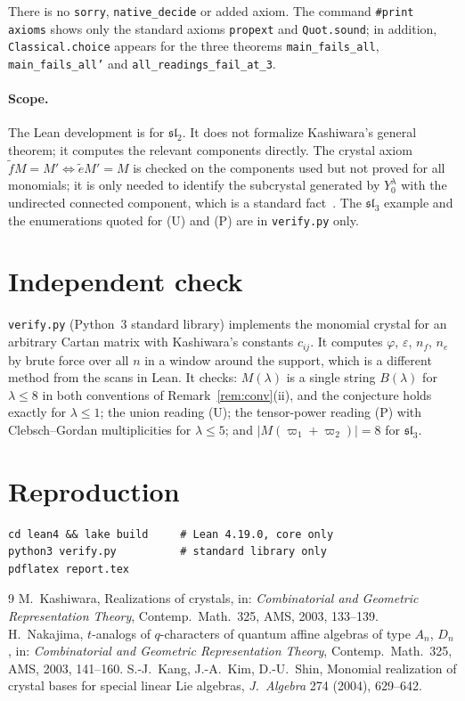 \documentclass[11pt]{article}
\theoremstyle{definition}
\theoremstyle{remark}
\newcommand{\et}{\tilde e}
\newcommand{\ft}{\tilde f}
\begin{document}
There is no \texttt{sorry}, \texttt{native\_decide} or added axiom.
The command \texttt{\#print axioms} shows only the standard axioms
\texttt{propext} and \texttt{Quot.sound}; in addition,
\texttt{Classical.choice} appears for the three theorems
\texttt{main\_fails\_all}, \texttt{main\_fails\_all'} and
\texttt{all\_readings\_fail\_at\_3}.

\paragraph{Scope.} The Lean development is for $\mathfrak{sl}_2$. It does not
formalize Kashiwara's general theorem; it computes the relevant components
directly. The crystal axiom $\ft M=M'\iff\et M'=M$ is checked on the components
used but not proved for all monomials; it is only needed to identify the
subcrystal generated by $Y_0^\lambda$ with the undirected connected component,
which is a standard fact~\cite{kas}. The $\mathfrak{sl}_3$ example and the
enumerations quoted for (U) and (P) are in \texttt{verify.py} only.

\section{Independent check}
\texttt{verify.py} (Python~3 standard library) implements the monomial crystal
for an arbitrary Cartan matrix with Kashiwara's constants $c_{ij}$. It computes
$\varphi$, $\varepsilon$, $n_f$, $n_e$ by brute force over all $n$ in a window
around the support, which is a different method from the scans in Lean. It
checks: $M(\lambda)$ is a single string $B(\lambda)$ for $\lambda\le8$ in both
conventions of Remark~\ref{rem:conv}(ii), and the conjecture holds exactly for
$\lambda\le1$; the union reading (U); the tensor-power reading (P) with
Clebsch--Gordan multiplicities for $\lambda\le5$; and $|M(\varpi_1+\varpi_2)|=8$ for
$\mathfrak{sl}_3$.

\section{Reproduction}
\begin{verbatim}
cd lean4 && lake build     # Lean 4.19.0, core only
python3 verify.py          # standard library only
pdflatex report.tex
\end{verbatim}

\begin{thebibliography}{9}
 M.~Kashiwara, Realizations of crystals, in: \emph{Combinatorial and
Geometric Representation Theory}, Contemp.\ Math.\ 325, AMS, 2003, 133--139.
 H.~Nakajima, $t$-analogs of $q$-characters of quantum affine
algebras of type $A_n$, $D_n$, in: \emph{Combinatorial and Geometric
Representation Theory}, Contemp.\ Math.\ 325, AMS, 2003, 141--160.
 S.-J.~Kang, J.-A.~Kim, D.-U.~Shin, Monomial realization of crystal
bases for special linear Lie algebras, \emph{J.~Algebra} 274 (2004), 629--642.
\end{thebibliography}
\end{document}
